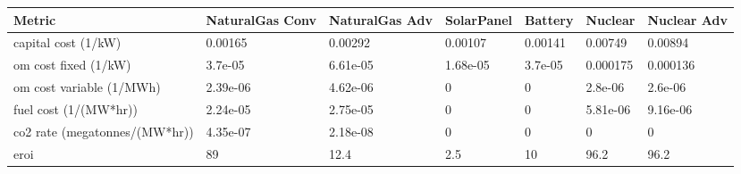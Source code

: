 \begin{tabular}{lllllll}
\toprule
Metric & NaturalGas Conv & NaturalGas Adv & SolarPanel & Battery & Nuclear & Nuclear Adv \\
\midrule
capital cost (1/kW) \cite{national_renewable_energy_laboratory_2023_2023}& 0.00165 & 0.00292 & 0.00107 & 0.00141 & 0.00749 & 0.00894 \\
om cost fixed (1/kW) \cite{national_renewable_energy_laboratory_2023_2023}& 3.7e-05 & 6.61e-05 & 1.68e-05 & 3.7e-05 & 0.000175 & 0.000136 \\
om cost variable (1/MWh) \cite{national_renewable_energy_laboratory_2023_2023}& 2.39e-06 & 4.62e-06 & 0 & 0 & 2.8e-06 & 2.6e-06 \\
fuel cost (1/(MW*hr))  \cite{national_renewable_energy_laboratory_2023_2023,desai_nuclear_2020}& 2.24e-05 & 2.75e-05 & 0 & 0 & 5.81e-06 & 9.16e-06 \\
co2 rate (megatonnes/(MW*hr)) \cite{energy_information_administration_how_2024}& 4.35e-07 & 2.18e-08 & 0 & 0 & 0 & 0 \\
eroi \cite{walmsley_energy_2018} & 89 & 12.4 & 2.5 & 10 & 96.2 & 96.2 \\
\bottomrule
\end{tabular}
